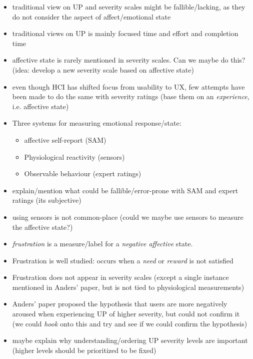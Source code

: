 \begin{itemize}
    \item traditional view on UP and severity scales might be fallible/lacking,
        as they do not consider the aspect of affect/emotional state
    \item traditional views on UP is mainly focused time and effort and completion
        time
    \item affective state is rarely mentioned in severity scales. Can we maybe
do this? (idea: develop a new severity scale based on affective state)
    \item even though HCI has shifted focus from usability to UX, few attempts have
        been made to do the same with severity ratings (base them on an
        \textit{experience}, i.e. affective state)
    \item Three systems for measuring emotional response/state:
        \begin{itemize}
            \item affective self-report (SAM)
            \item Physiological reactivity (sensors)
            \item Observable behaviour (expert ratings)
        \end{itemize}
    \item explain/mention what could be fallible/error-prone with SAM and expert
        ratings (its subjective)
    \item using sensors is not common-place (could we maybe use sensors to
        measure the affective state?)
    \item \textit{frustration} is a measure/label for a \textit{negative
        affective} state.
    \item Frustration is well studied: occurs when a \textit{need} or
        \textit{reward} is not satisfied
    \item Frustration does not appear in severity scales (except a single instance mentioned in Anders' paper, but is not tied to physiological measurements)
    \item Anders' paper proposed the hypothesis that users are more negatively
        aroused when experiencing UP of higher severity, but could not confirm
        it (we could \textit{hook}
        onto this and try and see if we could confirm the hypothesis)
    \item maybe explain why understanding/ordering UP severity levels are important
        (higher levels should be prioritized to be fixed)

\end{itemize}
